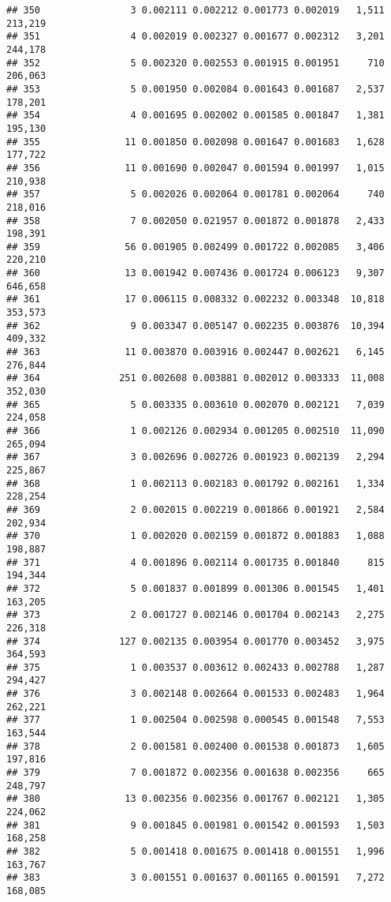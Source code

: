 \documentclass[]{article}
\begin{document}
\begin{verbatim}
## 350                3 0.002111 0.002212 0.001773 0.002019   1,511   213,219
## 351                4 0.002019 0.002327 0.001677 0.002312   3,201   244,178
## 352                5 0.002320 0.002553 0.001915 0.001951     710   206,063
## 353                5 0.001950 0.002084 0.001643 0.001687   2,537   178,201
## 354                4 0.001695 0.002002 0.001585 0.001847   1,381   195,130
## 355               11 0.001850 0.002098 0.001647 0.001683   1,628   177,722
## 356               11 0.001690 0.002047 0.001594 0.001997   1,015   210,938
## 357                5 0.002026 0.002064 0.001781 0.002064     740   218,016
## 358                7 0.002050 0.021957 0.001872 0.001878   2,433   198,391
## 359               56 0.001905 0.002499 0.001722 0.002085   3,406   220,210
## 360               13 0.001942 0.007436 0.001724 0.006123   9,307   646,658
## 361               17 0.006115 0.008332 0.002232 0.003348  10,818   353,573
## 362                9 0.003347 0.005147 0.002235 0.003876  10,394   409,332
## 363               11 0.003870 0.003916 0.002447 0.002621   6,145   276,844
## 364              251 0.002608 0.003881 0.002012 0.003333  11,008   352,030
## 365                5 0.003335 0.003610 0.002070 0.002121   7,039   224,058
## 366                1 0.002126 0.002934 0.001205 0.002510  11,090   265,094
## 367                3 0.002696 0.002726 0.001923 0.002139   2,294   225,867
## 368                1 0.002113 0.002183 0.001792 0.002161   1,334   228,254
## 369                2 0.002015 0.002219 0.001866 0.001921   2,584   202,934
## 370                1 0.002020 0.002159 0.001872 0.001883   1,088   198,887
## 371                4 0.001896 0.002114 0.001735 0.001840     815   194,344
## 372                5 0.001837 0.001899 0.001306 0.001545   1,401   163,205
## 373                2 0.001727 0.002146 0.001704 0.002143   2,275   226,318
## 374              127 0.002135 0.003954 0.001770 0.003452   3,975   364,593
## 375                1 0.003537 0.003612 0.002433 0.002788   1,287   294,427
## 376                3 0.002148 0.002664 0.001533 0.002483   1,964   262,221
## 377                1 0.002504 0.002598 0.000545 0.001548   7,553   163,544
## 378                2 0.001581 0.002400 0.001538 0.001873   1,605   197,816
## 379                7 0.001872 0.002356 0.001638 0.002356     665   248,797
## 380               13 0.002356 0.002356 0.001767 0.002121   1,305   224,062
## 381                9 0.001845 0.001981 0.001542 0.001593   1,503   168,258
## 382                5 0.001418 0.001675 0.001418 0.001551   1,996   163,767
## 383                3 0.001551 0.001637 0.001165 0.001591   7,272   168,085

\end{verbatim}
\end{document}
